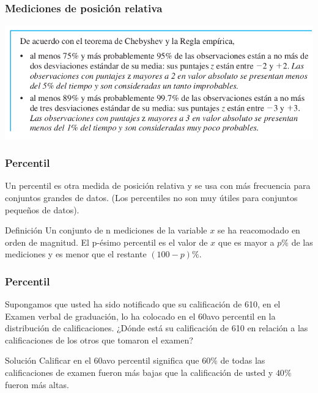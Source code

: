 \documentclass[spanish]{beamer}
\begin{document}
\begin{frame}
\frametitle{Mediciones de posición relativa }
\begin{center}
\includegraphics[scale=0.4]{im24}
\end{center}
\end{frame}
\begin{frame}
\frametitle{Percentil}
Un percentil es otra medida de posición relativa y se usa con más frecuencia para conjuntos grandes de datos. (Los percentiles no son muy útiles para conjuntos pequeños de datos).

\begin{block}{Definición}
Un conjunto de n mediciones de la variable $x$ se ha reacomodado en
orden de magnitud. El p-ésimo percentil es el valor de $x$ que es mayor a $p\%$ de las mediciones y es menor que el restante $(100 - p)\%$.
\end{block}


\end{frame}
\begin{frame}
\frametitle{Percentil}
Supongamos que usted ha sido notificado que su calificación de 610, en el Examen verbal de graduación, lo ha colocado en el 60avo percentil en la distribución de calificaciones. ¿Dónde está su calificación de 610 en relación a las calificaciones de los otros que tomaron el examen?

\vspace{1em}
Solución Calificar en el 60avo percentil significa que $60\%$ de todas las calificaciones de examen fueron más bajas que la calificación de usted y $40\%$ fueron más altas.

\end{frame}
\end{document}
